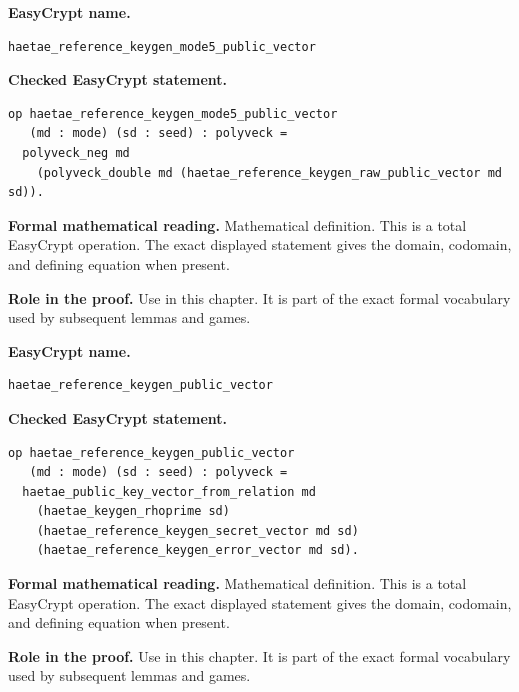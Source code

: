 \begin{formaldefinition}
\noindent\textbf{EasyCrypt name.}
\begin{lstlisting}[language=EasyCrypt,basicstyle=\ttfamily\scriptsize]
haetae_reference_keygen_mode5_public_vector
\end{lstlisting}
\noindent\textbf{Checked EasyCrypt statement.}
\begin{lstlisting}[language=EasyCrypt,basicstyle=\ttfamily\scriptsize]
op haetae_reference_keygen_mode5_public_vector
   (md : mode) (sd : seed) : polyveck =
  polyveck_neg md
    (polyveck_double md (haetae_reference_keygen_raw_public_vector md sd)).
\end{lstlisting}
\noindent\textbf{Formal mathematical reading.}
Mathematical definition. This is a total EasyCrypt operation.  The exact displayed statement gives the domain, codomain, and defining equation when present.

\noindent\textbf{Role in the proof.}
Use in this chapter. It is part of the exact formal vocabulary used by subsequent lemmas and games.

\end{formaldefinition}

\begin{formaldefinition}
\noindent\textbf{EasyCrypt name.}
\begin{lstlisting}[language=EasyCrypt,basicstyle=\ttfamily\scriptsize]
haetae_reference_keygen_public_vector
\end{lstlisting}
\noindent\textbf{Checked EasyCrypt statement.}
\begin{lstlisting}[language=EasyCrypt,basicstyle=\ttfamily\scriptsize]
op haetae_reference_keygen_public_vector
   (md : mode) (sd : seed) : polyveck =
  haetae_public_key_vector_from_relation md
    (haetae_keygen_rhoprime sd)
    (haetae_reference_keygen_secret_vector md sd)
    (haetae_reference_keygen_error_vector md sd).
\end{lstlisting}
\noindent\textbf{Formal mathematical reading.}
Mathematical definition. This is a total EasyCrypt operation.  The exact displayed statement gives the domain, codomain, and defining equation when present.

\noindent\textbf{Role in the proof.}
Use in this chapter. It is part of the exact formal vocabulary used by subsequent lemmas and games.

\end{formaldefinition}

